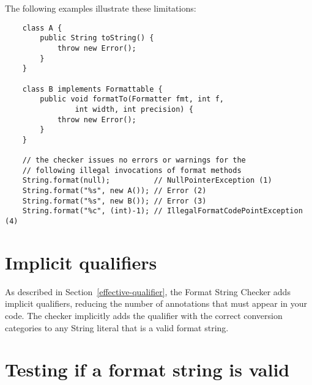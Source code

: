 \noindent The following examples illustrate these limitations:

\begin{Verbatim}
    class A {
        public String toString() {
            throw new Error();
        }
    }

    class B implements Formattable {
        public void formatTo(Formatter fmt, int f, 
                int width, int precision) {
            throw new Error();
        }
    }

    // the checker issues no errors or warnings for the
    // following illegal invocations of format methods
    String.format(null);          // NullPointerException (1)
    String.format("%s", new A()); // Error (2)
    String.format("%s", new B()); // Error (3)
    String.format("%c", (int)-1); // IllegalFormatCodePointException (4)
\end{Verbatim}

% 
% 


\section{Implicit qualifiers}

As described in Section~\ref{effective-qualifier}, the Format String Checker adds implicit
qualifiers, reducing the number of annotations that must appear in your code.
The checker implicitly adds the  qualifier with the correct
conversion categories to any String literal that is a valid format string.

\section{Testing if a format string is valid}

